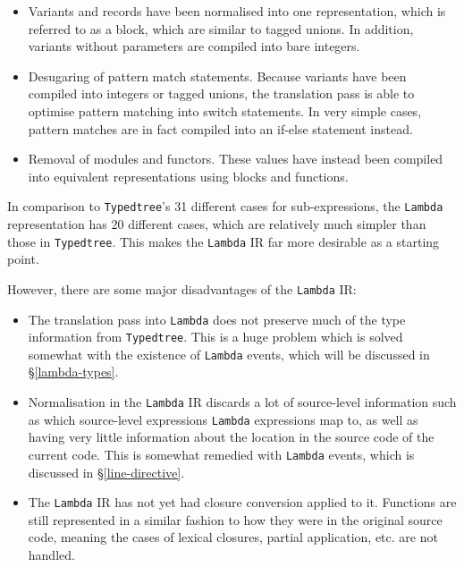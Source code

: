 \begin{itemize}

\item Variants and records have been normalised into one representation, which
    is referred to as a block, which are similar to tagged unions. In addition,
    variants without parameters are compiled into bare integers.

\item Desugaring of pattern match statements. Because variants have been
    compiled into integers or tagged unions, the translation pass is able to
    optimise pattern matching into switch statements. In very simple cases,
    pattern matches are in fact compiled into an if-else statement instead.

\item Removal of modules and functors. These values have instead been compiled
    into equivalent representations using blocks and functions.

\end{itemize}

In comparison to \texttt{Typedtree}'s 31 different cases for sub-expressions, 
the \texttt{Lambda} representation has 20 different cases, which are relatively 
much simpler than those in \texttt{Typedtree}. This makes the \texttt{Lambda} 
IR far more desirable as a starting point.

However, there are some major disadvantages of the \texttt{Lambda} IR:

\begin{itemize}

\item The translation pass into \texttt{Lambda} does not preserve much of the
    type information from \texttt{Typedtree}. This is a huge problem which is
    solved somewhat with the existence of \texttt{Lambda} events, which will be
    discussed in \S\ref{lambda-types}.

\item Normalisation in the \texttt{Lambda} IR discards a lot of source-level
    information such as which source-level expressions \texttt{Lambda}
    expressions map to, as well as having very little information about the
    location in the source code of the current code. This is somewhat remedied
    with \texttt{Lambda} events, which is discussed in \S\ref{line-directive}.

\item The \texttt{Lambda} IR has not yet had closure conversion applied to it.
    Functions are still represented in a similar fashion to how they were in the
    original source code, meaning the cases of lexical closures, partial
    application, etc. are not handled.

\end{itemize}

